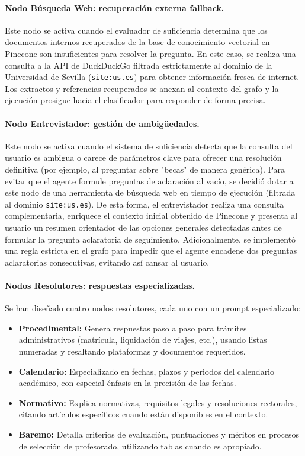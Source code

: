 \documentclass[12pt,a4paper,oneside]{report}
\begin{document}
\paragraph{Nodo Búsqueda Web: recuperación externa fallback.} Este nodo se activa cuando el evaluador de suficiencia determina que los documentos internos recuperados de la base de conocimiento vectorial en Pinecone son insuficientes para resolver la pregunta. En este caso, se realiza una consulta a la API de DuckDuckGo filtrada estrictamente al dominio de la Universidad de Sevilla (\texttt{site:us.es}) para obtener información fresca de internet. Los extractos y referencias recuperados se anexan al contexto del grafo y la ejecución prosigue hacia el clasificador para responder de forma precisa.

\paragraph{Nodo Entrevistador: gestión de ambigüedades.} Este nodo se activa cuando el sistema de suficiencia detecta que la consulta del usuario es ambigua o carece de parámetros clave para ofrecer una resolución definitiva (por ejemplo, al preguntar sobre "becas" de manera genérica). Para evitar que el agente formule preguntas de aclaración al vacío, se decidió dotar a este nodo de una herramienta de búsqueda web en tiempo de ejecución (filtrada al dominio \texttt{site:us.es}). De esta forma, el entrevistador realiza una consulta complementaria, enriquece el contexto inicial obtenido de Pinecone y presenta al usuario un resumen orientador de las opciones generales detectadas antes de formular la pregunta aclaratoria de seguimiento. Adicionalmente, se implementó una regla estricta en el grafo para impedir que el agente encadene dos preguntas aclaratorias consecutivas, evitando así cansar al usuario.

\paragraph{Nodos Resolutores: respuestas especializadas.} Se han diseñado cuatro nodos resolutores, cada uno con un prompt especializado:

\begin{itemize}
    \item \textbf{Procedimental:} Genera respuestas paso a paso para trámites administrativos (matrícula, liquidación de viajes, etc.), usando listas numeradas y resaltando plataformas y documentos requeridos.
    \item \textbf{Calendario:} Especializado en fechas, plazos y periodos del calendario académico, con especial énfasis en la precisión de las fechas.
    \item \textbf{Normativo:} Explica normativas, requisitos legales y resoluciones rectorales, citando artículos específicos cuando están disponibles en el contexto.
    \item \textbf{Baremo:} Detalla criterios de evaluación, puntuaciones y méritos en procesos de selección de profesorado, utilizando tablas cuando es apropiado.
\end{itemize}
\end{document}
